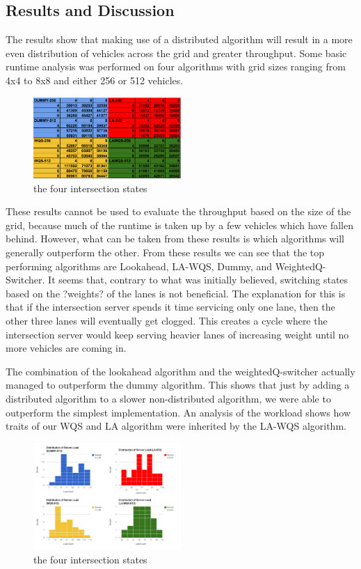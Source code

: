 \documentclass[conference]{IEEEtran}
\begin{document}
\subsection{Results and Discussion}
The results show that making use of a distributed algorithm will result in a more even distribution of vehicles across the grid and greater throughput. Some basic runtime analysis was performed on four algorithms with grid sizes ranging from 4x4 to 8x8 and either 256 or 512 vehicles.

\begin{figure}[h]
    \center    
    \includegraphics[width=0.5\textwidth]{images/simulation_duration.png}
	\caption{the four intersection states}
	\label{intersection_states}
\end{figure}


These results cannot be used to evaluate the throughput based on the size of the grid, because much of the runtime is taken up by a few vehicles which have fallen behind. However, what can be taken from these results is which algorithms will generally outperform the other. From these results we can see that the top performing algorithms are Lookahead, LA-WQS, Dummy, and WeightedQ-Switcher. It seems that, contrary to what was initially believed, switching states based on the ?weights? of the lanes is not beneficial. The explanation for this is that if the intersection server spends it time servicing only one lane, then the other three lanes will eventually get clogged. This creates a cycle where the intersection server would keep serving heavier lanes of increasing weight until no more vehicles are coming in.

The combination of the lookahead algorithm and the weightedQ-switcher actually managed to outperform the dummy algorithm. This shows that just by adding a distributed algorithm to a slower non-distributed algorithm, we were able to outperform the simplest implementation. An analysis of the workload shows how traits of our WQS and LA algorithm were inherited by the LA-WQS algorithm.


\begin{figure}[h]
    \center    
    \includegraphics[width=0.5\textwidth]{images/intersection_load.png}
	\caption{the four intersection states}
	\label{intersection_states}
\end{figure}
\end{document}
